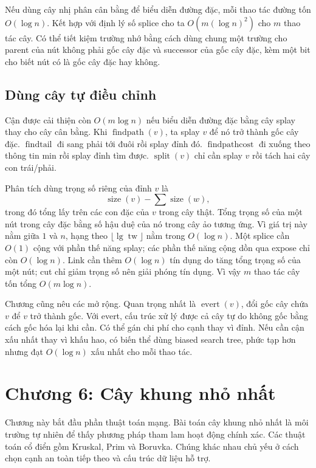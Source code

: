 \documentclass[11pt]{article}
\begin{document}
Nếu dùng cây nhị phân cân bằng để biểu diễn đường đặc, mỗi thao tác đường tốn
\(O(\log n)\). Kết hợp với định lý số splice cho ta \(O(m(\log n)^2)\) cho \(m\)
thao tác cây. Có thể tiết kiệm trường nhớ bằng cách dùng chung một trường cho
parent của nút không phải gốc cây đặc và successor của gốc cây đặc, kèm một bit
cho biết nút có là gốc cây đặc hay không.

\subsection*{Dùng cây tự điều chỉnh}

Cận được cải thiện còn \(O(m\log n)\) nếu biểu diễn đường đặc bằng cây splay
thay cho cây cân bằng. Khi \(\operatorname{findpath}(v)\), ta splay \(v\) để nó
trở thành gốc cây đặc. \(\operatorname{findtail}\) đi sang phải tới đuôi rồi
splay đỉnh đó. \(\operatorname{findpathcost}\) đi xuống theo thông tin min rồi
splay đỉnh tìm được. \(\operatorname{split}(v)\) chỉ cần splay \(v\) rồi tách
hai cây con trái/phải.

Phân tích dùng trọng số riêng của đỉnh \(v\) là
\[
  \operatorname{size}(v)-\sum \operatorname{size}(w),
\]
trong đó tổng lấy trên các con đặc của \(v\) trong cây thật. Tổng trọng số của
một nút trong cây đặc bằng số hậu duệ của nó trong cây ảo tương ứng. Vì giá trị
này nằm giữa \(1\) và \(n\), hạng theo \(\lfloor\lg \operatorname{tw}\rfloor\)
nằm trong \(O(\log n)\). Một splice cần \(O(1)\) cộng với phần thế năng splay;
các phần thế năng cộng dồn qua expose chỉ còn \(O(\log n)\). Link cần thêm
\(O(\log n)\) tín dụng do tăng tổng trọng số của một nút; cut chỉ giảm trọng số
nên giải phóng tín dụng. Vì vậy \(m\) thao tác cây tốn tổng \(O(m\log n)\).

Chương cũng nêu các mở rộng. Quan trọng nhất là \(\operatorname{evert}(v)\), đổi
gốc cây chứa \(v\) để \(v\) trở thành gốc. Với evert, cấu trúc xử lý được cả cây
tự do không gốc bằng cách gốc hóa lại khi cần. Có thể gán chi phí cho cạnh thay
vì đỉnh. Nếu cần cận xấu nhất thay vì khấu hao, có biến thể dùng biased search
tree, phức tạp hơn nhưng đạt \(O(\log n)\) xấu nhất cho mỗi thao tác.

\section{Chương 6: Cây khung nhỏ nhất}

Chương này bắt đầu phần thuật toán mạng. Bài toán cây khung nhỏ nhất là môi
trường tự nhiên để thấy phương pháp tham lam hoạt động chính xác. Các thuật
toán cổ điển gồm Kruskal, Prim và Boruvka. Chúng khác nhau chủ yếu ở cách chọn
cạnh an toàn tiếp theo và cấu trúc dữ liệu hỗ trợ.
\end{document}
